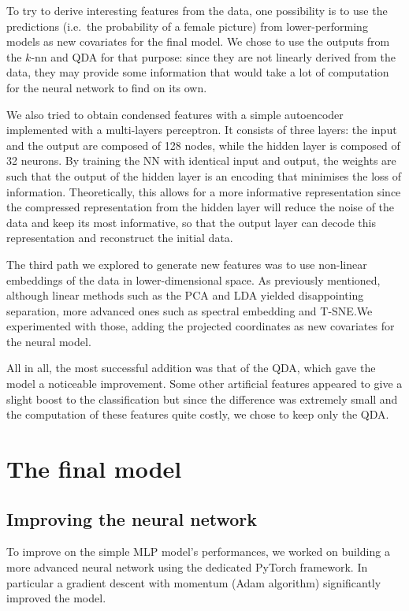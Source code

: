 \documentclass[a4paper,11pt,openany,extrafontsizes,oneside,article,twocolumn]{memoir}
\begin{document}
To try to derive interesting features from the data, one possibility
is to use the predictions (i.e.\ the probability of a female picture)
from lower-performing models as new covariates for the final model. We
chose to use the outputs from the $k$-nn and QDA for that purpose:
since they are not linearly derived from the data, they may provide
some information that would take a lot of computation for the neural
network to find on its own.

We also tried to obtain condensed features with a simple autoencoder
implemented with a multi-layers perceptron. It consists of three
layers: the input and the output are composed of 128 nodes, while the
hidden layer is composed of 32 neurons. By training the NN with
identical input and output, the weights are such that the output of
the hidden layer is an encoding that minimises the loss of
information. Theoretically, this allows for a more informative
representation since the compressed representation from the hidden
layer will reduce the noise of the data and keep its most informative,
so that the output layer can decode this representation and
reconstruct the initial data.

The third path we explored to generate new features was to use
non-linear embeddings of the data in lower-dimensional space. As
previously mentioned, although linear methods such as the PCA and LDA
yielded disappointing separation, more advanced ones such as spectral
embedding and T-SNE.\@ We experimented with those, adding the
projected coordinates as new covariates for the neural model.

All in all, the most successful addition was that of the QDA, which
gave the model a noticeable improvement. Some other artificial
features appeared to give a slight boost to the classification but
since the difference was extremely small and the computation of these
features quite costly, we chose to keep only the QDA.\@


\chapter{The final model}

\section{Improving the neural network}

To improve on the simple MLP model's performances, we worked on
building a more advanced neural network using the dedicated PyTorch
framework. In particular a gradient descent with momentum (Adam
algorithm) significantly improved the model.
\end{document}
